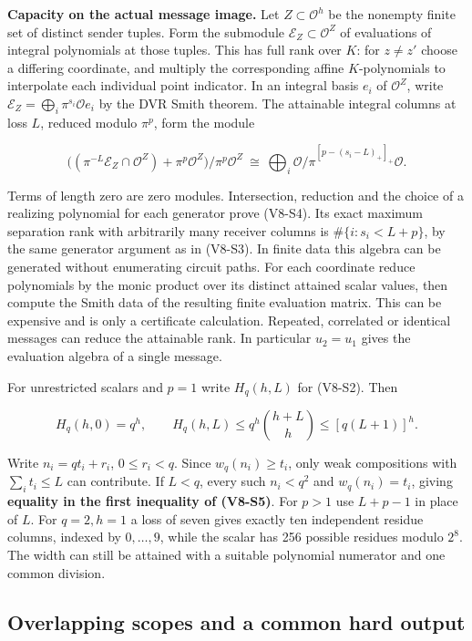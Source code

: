 \documentclass[11pt,a4paper]{article}
\begin{document}
\textbf{Capacity on the actual message image.} Let
\(Z\subset\mathcal O^h\) be the nonempty finite set of distinct sender
tuples. Form the submodule \(\mathcal E_Z\subset\mathcal O^Z\) of
evaluations of integral polynomials at those tuples. This has full rank
over \(K\): for \(z\ne z'\) choose a differing coordinate, and multiply
the corresponding affine \(K\)-polynomials to interpolate each
individual point indicator. In an integral basis \(e_i\) of
\(\mathcal O^Z\), write
\(\mathcal E_Z=\bigoplus_i \pi^{s_i}\mathcal O e_i\) by the DVR Smith
theorem. The attainable integral columns at loss \(L\), reduced modulo
\(\pi^p\), form the module

\[
 \big((\pi^{-L}\mathcal E_Z\cap\mathcal O^Z)+\pi^p\mathcal O^Z\big)/
                   \pi^p\mathcal O^Z
 \ \cong\ \bigoplus_i \mathcal O/\pi^{[p-(s_i-L)_+]_+}\mathcal O.       \tag{V8-S4}
\]

Terms of length zero are zero modules. Intersection, reduction and the
choice of a realizing polynomial for each generator prove (V8-S4). Its
exact maximum separation rank with arbitrarily many receiver columns is
\(\#\{i:s_i<L+p\}\), by the same generator argument as in (V8-S3). In
finite data this algebra can be generated without enumerating circuit
paths. For each coordinate reduce polynomials by the monic product over
its distinct attained scalar values, then compute the Smith data of the
resulting finite evaluation matrix. This can be expensive and is only a
certificate calculation. Repeated, correlated or identical messages can
reduce the attainable rank. In particular \(u_2=u_1\) gives the
evaluation algebra of a single message.

For unrestricted scalars and \(p=1\) write \(H_q(h,L)\) for (V8-S2). Then

\[
 H_q(h,0)=q^h,\qquad
 H_q(h,L)\le q^h {h+L\choose h}\le [q(L+1)]^h.                      \tag{V8-S5}
\]

Write \(n_i=q t_i+r_i\), \(0\le r_i<q\). Since \(w_q(n_i)\ge t_i\), only
weak compositions with \(\sum_i t_i\le L\) can contribute. If \(L<q\),
every such \(n_i<q^2\) and \(w_q(n_i)=t_i\), giving \textbf{equality in
the first inequality of (V8-S5)}. For \(p>1\) use \(L+p-1\) in place of
\(L\). For \(q=2,h=1\) a loss of seven gives exactly ten independent
residue columns, indexed by \(0,\ldots,9\), while the scalar has 256
possible residues modulo \(2^8\). The width can still be attained with a
suitable polynomial numerator and one common division.

\subsection{Overlapping scopes and a common hard
output}\label{v8-overlapping-scopes-and-a-common-hard-output}
\end{document}
